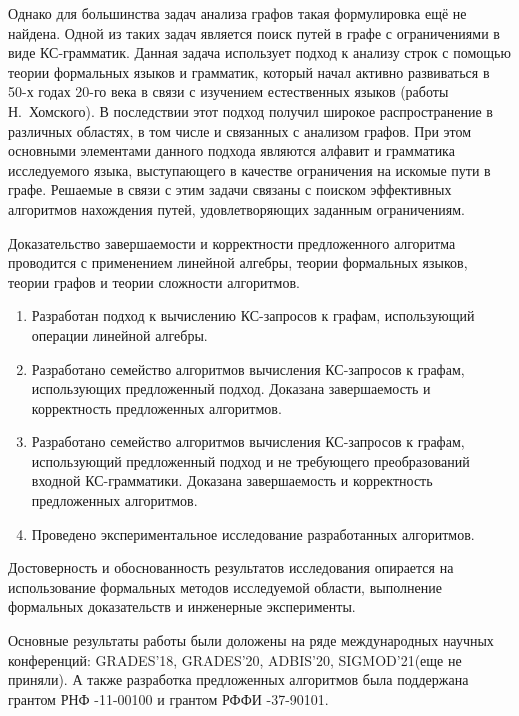 Однако для большинства задач анализа графов такая формулировка ещё не найдена. Одной из таких задач является поиск путей в графе с ограничениями в виде КС-грамматик. Данная задача использует подход к анализу строк с помощью теории формальных языков и грамматик, который начал активно развиваться в 50-х годах 20-го века в связи с изучением естественных языков (работы Н.~Хомского). В последствии этот подход получил широкое распространение в различных областях, в том числе и связанных с анализом графов.
При этом основными элементами данного подхода являются алфавит и грамматика исследуемого языка, выступающего в качестве ограничения на искомые пути в графе. Решаемые в связи с этим задачи связаны с поиском эффективных алгоритмов нахождения путей, удовлетворяющих заданным ограничениям.

Доказательство завершаемости и корректности предложенного алгоритма проводится с применением линейной алгебры, теории формальных языков, теории графов и теории сложности алгоритмов.

{}
\begin{enumerate}[beginpenalty=10000] %
	\item Разработан подход к вычислению КС-запросов к графам, использующий операции линейной алгебры.
	\item Разработано семейство алгоритмов вычисления КС-запросов к графам, использующих предложенный подход. Доказана завершаемость и корректность предложенных алгоритмов.
	\item Разработано семейство алгоритмов вычисления КС-запросов к графам, использующий предложенный подход и не требующего преобразований входной КС-грамматики. Доказана завершаемость и корректность предложенных алгоритмов.
	\item Проведено экспериментальное исследование разработанных алгоритмов.
\end{enumerate}

{\reliability} 
Достоверность и обоснованность результатов исследования опирается на использование формальных методов исследуемой области, выполнение формальных доказательств и инженерные эксперименты.

Основные результаты работы были доложены на ряде международных научных конференций: GRADES'18, GRADES'20, ADBIS’20, SIGMOD'21(еще не приняли). А также разработка предложенных алгоритмов была поддержана грантом РНФ -11-00100 и грантом РФФИ -37-90101.



